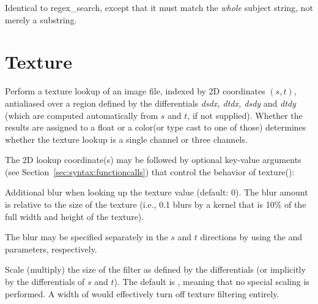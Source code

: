 \documentclass[11pt,letterpaper]{book}
\def\color{{\cf color}\xspace}
\def\float{{\cf float}\xspace}
\begin{document}
\apiend

Identical to {\cf regex_search}, except that it must match the
\emph{whole} {\cf subject} string, not merely a substring.
\apiend




\section{Texture}
\label{sec:stdlib:texture}


Perform a texture lookup of an image file, indexed by 2D coordinates
$(s,t)$, antialiased over a region defined by the differentials
\emph{dsdx, dtdx, dsdy} and \emph{dtdy} (which are computed
automatically from $s$ and $t$, if not supplied).  Whether the results
are assigned to a \float or a \color (or type cast to one of those)
determines whether the texture lookup is a single channel or three
channels.

The 2D lookup coordinate(s) may be followed by optional key-value
arguments (see Section~\ref{sec:syntax:functioncalls}) that control the behavior of {\cf texture()}:

\vspace{12pt}
Additional blur when looking up the texture value (default: 0).  The
blur amount is relative to the size of the texture (i.e., 0.1 blurs by a
kernel that is 10\% of the full width and height of the texture).

The blur may be specified separately in the $s$ and $t$ directions by
using the  and  parameters, respectively.
\apiend
\vspace{-16pt}

\vspace{12pt}
Scale (multiply) the size of the filter as defined by the differentials
(or implicitly by the differentials of $s$ and $t$).  The default is
{}, meaning that no special scaling is performed.  A width of
{} would effectively turn off texture filtering entirely.
\end{document}
